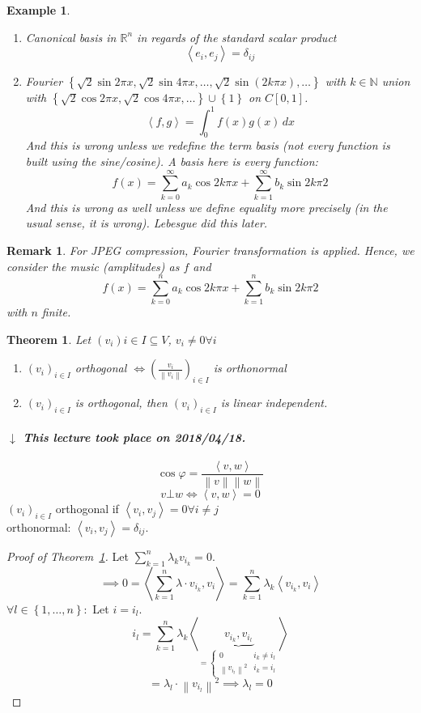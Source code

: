 \documentclass{article}
\newtheorem{theorem}{Theorem}  \numberwithin{theorem}{section}
\newtheorem{example}{Example}  \numberwithin{example}{section}
\newtheorem{remark}{Remark}  \numberwithin{remark}{section}
\newcommand{\set}[1]{\left\{#1\right\}}
\newcommand{\ip}[2]{\left\langle#1,#2\right\rangle} %
\newcommand{\angel}[1]{\left\langle#1\right\rangle}
\newcommand{\norm}[1]{\left\|#1\right\|}
\newcommand{\dateref}[1]{%
  \begin{mdframed}[backgroundcolor=gray!10,innerbottommargin=0pt,innertopmargin=0pt]
    \paragraph{\textit{$\downarrow$ This lecture took place on #1.}}%
  \end{mdframed}%
}
\begin{document}
\begin{example} %
  \begin{enumerate}
    \item Canonical basis in $\mathbb R^n$ in regards of the standard scalar product
      \[ \ip{e_i}{e_j} = \delta_{ij} \]
    \item Fourier $\set{\sqrt 2 \sin{2\pi x}, \sqrt2 \sin{4\pi x}, \ldots, \sqrt2 \sin(2k \pi x), \ldots}$ with $k \in \mathbb N$
      union with $\set{\sqrt2 \cos{2\pi x}, \sqrt2 \cos{4\pi x}, \ldots} \cup \set{\mathfrak 1}$
      on $C[0,1]$.
      \[ \ip fg = \int_0^1 f(x) g(x) \, dx \]
      And this is wrong unless we redefine the term basis (not every function is built using the sine/cosine).
      A basis here is every function:
      \[ f(x) = \sum_{k=0}^\infty a_k \cos{2k \pi x} + \sum_{k=1}^\infty b_k \sin{2k \pi 2} \]
      And this is wrong as well unless we define equality more precisely (in the usual sense, it is wrong).
      Lebesgue did this later.
  \end{enumerate}
\end{example}

\begin{remark}
  For JPEG compression, Fourier transformation is applied. Hence, we consider
  the music (amplitudes) as $f$ and
  \[ f(x) = \sum_{k=0}^n a_k \cos{2k \pi x} + \sum_{k=1}^n b_k \sin{2k \pi 2} \]
  with $n$ finite.
\end{remark}

\begin{theorem} %
  \label{thm838}
  Let $(v_i){i \in I} \subseteq V$, $v_i \neq 0 \forall i$
  \begin{enumerate}
    \item $(v_i)_{i \in I}$ orthogonal $\iff \left(\frac{v_i}{\norm{v_i}}\right)_{i \in I}$ is orthonormal
    \item $(v_i)_{i \in I}$ is orthogonal, then $(v_i)_{i \in I}$ is linear independent.
  \end{enumerate}
\end{theorem}

\dateref{2018/04/18}

\[ \cos\varphi = \frac{\ip vw}{\norm{v} \norm{w}} \]
\[ v \bot w \iff \ip vw = 0 \]
$(v_i)_{i \in I}$ orthogonal if $\ip{v_i}{v_j} = 0 \forall i \neq j$ \\
orthonormal: $\ip{v_i}{v_j} = \delta_{ij}$.

\begin{proof}[Proof of Theorem~\ref{thm838}]
  Let $\sum_{k=1}^n \lambda_k v_{i_k} = 0$.
  \[ \implies 0 = \angel{\sum_{k=1}^n \lambda \cdot v_{i_k}, v_i} = \sum_{k=1}^n \lambda_k \angel{v_{i_k}, v_i} \]
  $\forall l \in \set{1, \ldots, n}:$ Let $i = i_l$.
  \[ i_l = \sum_{k=1}^n \lambda_k \angel{\underbrace{v_{i_k}, v_{i_l}}_{= \begin{cases} 0 & i_k \neq i_l \\ \norm{v_{i_l}}^2 & i_k = i_l \end{cases}} } \]
  \[ = \lambda_l \cdot \norm{v_{i_l}}^2 \implies \lambda_l = 0 \]
\end{proof}
\end{document}
